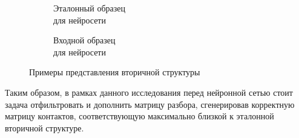 \begin{figure}[h]
\begin{subfigure}{.3\textwidth}
  \caption{Эталонный  образец \\ для нейросети}
  \label{struc_b}
\end{subfigure}
\begin{subfigure}{.3\textwidth}
  \centering
  \caption{Входной образец \\ для нейросети}
  \label{struc_c}
\end{subfigure}
\caption{Примеры представления вторичной структуры}
\label{struc}
\end{figure}

Таким образом, в рамках данного исследования перед нейронной сетью стоит задача отфильтровать и дополнить матрицу разбора, сгенерировав корректную матрицу контактов, соответствующую максимально близкой к эталонной вторичной структуре.


